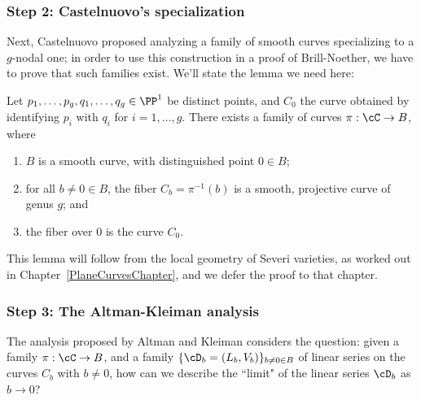 \subsubsection{Step 2: Castelnuovo's specialization}

Next, Castelnuovo proposed analyzing a family of smooth curves specializing to a $g$-nodal one; in order to use this construction in a proof of Brill-Noether, we have to prove that such families exist. We'll state the lemma we need here:

\begin{lemma}\label{specialization to nodal curve}
Let $p_1,\dots,p_g, q_1,\dots, q_g \in \PP^1$ be distinct points, and $C_0$ the curve obtained by identifying $p_i$ with $q_i$ for $i = 1,\dots,g$. There exists a family of curves $\pi : \cC \to B$, where
\begin{enumerate}
\item $B$ is a smooth curve, with distinguished point $0 \in B$;
\item for all $b \neq 0 \in B$, the fiber $C_b = \pi^{-1}(b)$ is a smooth, projective curve of genus $g$;  and
\item the fiber over $0$ is the curve $C_0$.
\end{enumerate}
\end{lemma}

This lemma will follow from the local geometry of Severi varieties, as worked out in Chapter~\ref{PlaneCurvesChapter}, and we defer the proof to that chapter.

%
%

\subsubsection{Step 3: The Altman-Kleiman analysis}

The analysis proposed by Altman and Kleiman considers the question: given a family $\pi : \cC \to B$, and a family $\{ \cD_b = (L_b, V_b)\}_{b \neq 0 \in B}$ of linear series on the curves $C_b$ with $b \neq 0$, how can we describe the ``limit" of the linear series $\cD_b$ as $b \to 0$? 

